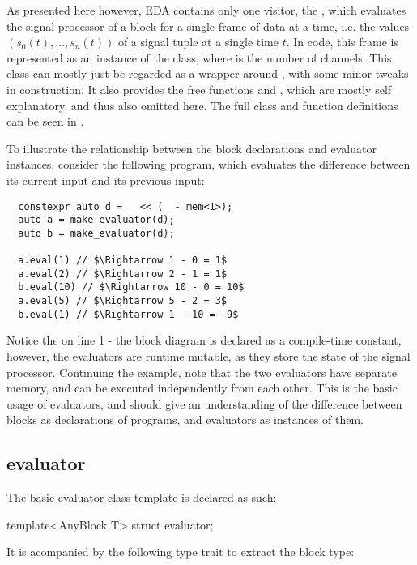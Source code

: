 As presented here however, EDA contains only one visitor, the , which evaluates the
signal processor of a block for a single frame of data at a time, i.e. the values $(s_0(t), \dots, s_n(t))$ of a
signal tuple at a single time $t$. In code, this frame is represented as an instance of
the  class, where
 is the number of channels. This class can mostly just be regarded as a wrapper around , with some minor tweaks in construction. It also provides the free functions
 and , which are mostly self explanatory, and
thus also omitted here. The full class and function definitions can be seen in .

To illustrate the relationship between the block declarations and evaluator instances, consider the following
program, which evaluates the difference between its current input and its previous input:

\begin{verbatim}
  constexpr auto d = _ << (_ - mem<1>);
  auto a = make_evaluator(d);
  auto b = make_evaluator(d);
  
  a.eval(1) // $\Rightarrow 1 - 0 = 1$
  a.eval(2) // $\Rightarrow 2 - 1 = 1$
  b.eval(10) // $\Rightarrow 10 - 0 = 10$
  a.eval(5) // $\Rightarrow 5 - 2 = 3$
  b.eval(1) // $\Rightarrow 1 - 10 = -9$
\end{verbatim}

Notice the  on line 1 - the block diagram is declared as a compile-time constant,
however, the evaluators  are runtime mutable, as they store the state of the signal processor. Continuing the
example, note that the two evaluators have separate memory, and can be executed independently from each
other. This is the basic usage of evaluators, and should give an understanding of the difference between
blocks as declarations of programs, and evaluators as instances of them.

\subsection{evaluator}
The basic evaluator class template is declared as such:

\begin{cppcodenl}
  template<AnyBlock T>
  struct evaluator;
\end{cppcodenl}

It is acompanied by the following type trait to extract the block type:

